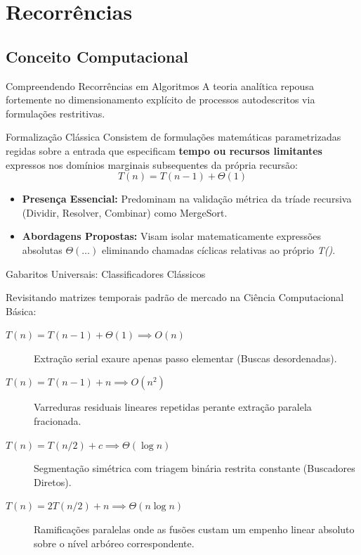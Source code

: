 \documentclass{beamer}
\begin{document}
\section{Recorrências}
\subsection{Conceito Computacional}
\begin{frame}{Compreendendo Recorrências em Algoritmos}    
\footnotesize
A teoria analítica repousa fortemente no dimensionamento explícito de processos autodescritos via formulações restritivas.

\begin{block}{Formalização Clássica}
Consistem de formulações matemáticas parametrizadas regidas sobre a entrada que especificam \textbf{tempo ou recursos limitantes} expressos nos domínios marginais subsequentes da própria recursão:
$$T(n) = T(n-1) + \Theta(1)$$
\end{block}
\pause
\begin{itemize}
 \item \textbf{Presença Essencial:} Predominam na validação métrica da tríade recursiva (Dividir, Resolver, Combinar) como MergeSort.
 \item \textbf{Abordagens Propostas:} Visam isolar matematicamente expressões absolutas $\Theta(\dots)$ eliminando chamadas cíclicas relativas ao próprio \textit{T()}.
\end{itemize}
\end{frame}


\begin{frame}{Gabaritos Universais: Classificadores Clássicos}    
  \footnotesize

Revisitando matrizes temporais padrão de mercado na Ciência Computacional Básica:
\pause
\begin{description}
 \item[$T(n) = T(n-1) + \Theta(1) \implies O(n)$] 
 \hfill \break Extração serial exaure apenas passo elementar (Buscas desordenadas).
 \pause
 \item[$T(n) = T(n-1) + n \implies O(n^2)$] 
 \hfill \break Varreduras residuais lineares repetidas perante extração paralela fracionada.
 \pause
 \item[$T(n) = T(n/2) + c \implies \Theta(\log n)$] 
 \hfill \break Segmentação simétrica com triagem binária restrita constante (Buscadores Diretos).
 \pause
 \item[$T(n) = 2T(n/2) + n \implies \Theta(n \log n)$] 
 \hfill \break Ramificações paralelas onde as fusões custam um empenho linear absoluto sobre o nível arbóreo correspondente.
\end{description}
\end{frame}
\end{document}
